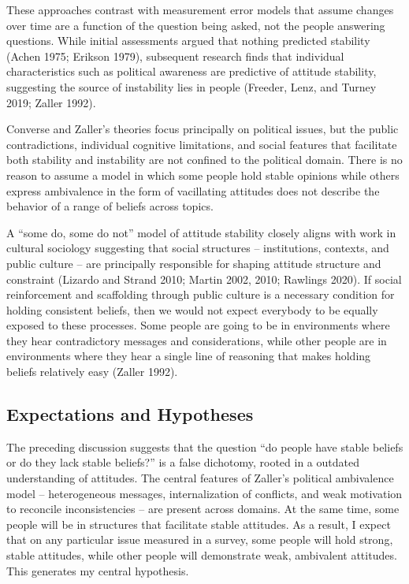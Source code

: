 \documentclass[12pt,]{article}
\begin{document}
These approaches contrast with measurement error models that assume changes over time are a function of the question being asked, not the people answering questions. While initial assessments argued that nothing predicted stability (Achen 1975; Erikson 1979), subsequent research finds that individual characteristics such as political awareness are predictive of attitude stability, suggesting the source of instability lies in people (Freeder, Lenz, and Turney 2019; Zaller 1992).

Converse and Zaller's theories focus principally on political issues, but the public contradictions, individual cognitive limitations, and social features that facilitate both stability and instability are not confined to the political domain. There is no reason to assume a model in which some people hold stable opinions while others express ambivalence in the form of vacillating attitudes does not describe the behavior of a range of beliefs across topics.

A ``some do, some do not'' model of attitude stability closely aligns with work in cultural sociology suggesting that social structures -- institutions, contexts, and public culture -- are principally responsible for shaping attitude structure and constraint (Lizardo and Strand 2010; Martin 2002, 2010; Rawlings 2020). If social reinforcement and scaffolding through public culture is a necessary condition for holding consistent beliefs, then we would not expect everybody to be equally exposed to these processes. Some people are going to be in environments where they hear contradictory messages and considerations, while other people are in environments where they hear a single line of reasoning that makes holding beliefs relatively easy (Zaller 1992).

\hypertarget{expectations-and-hypotheses}{%
\subsection{Expectations and Hypotheses}\label{expectations-and-hypotheses}}

The preceding discussion suggests that the question ``do people have stable beliefs or do they lack stable beliefs?'' is a false dichotomy, rooted in a outdated understanding of attitudes. The central features of Zaller's political ambivalence model -- heterogeneous messages, internalization of conflicts, and weak motivation to reconcile inconsistencies -- are present across domains. At the same time, some people will be in structures that facilitate stable attitudes. As a result, I expect that on any particular issue measured in a survey, some people will hold strong, stable attitudes, while other people will demonstrate weak, ambivalent attitudes. This generates my central hypothesis.
\end{document}
